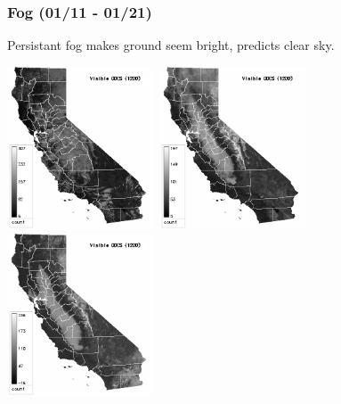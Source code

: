 \documentclass{beamer}
\begin{document}
\begin{frame}
  \frametitle{Fog (01/11 - 01/21)}

  \begin{block}{}
    Persistant fog makes ground seem bright, predicts clear sky.
  \end{block}

  \includegraphics[width=0.33\textwidth]{2005-01-11/vis1200.png}
  \includegraphics[width=0.33\textwidth]{2005-01-15/vis1200.png}
  \includegraphics[width=0.33\textwidth]{2005-01-21/vis1200.png}

\end{frame}
\end{document}
